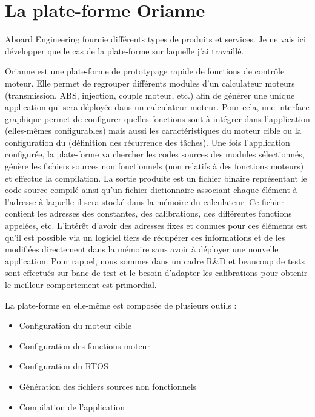 \section{La plate-forme Orianne}
\label{sec:orianne}

Aboard Engineering fournie différents types de produits et services. Je ne vais ici développer que le cas de la plate-forme  sur laquelle j'ai travaillé.

Orianne est une plate-forme de prototypage rapide de fonctions de contrôle moteur.
Elle permet de regrouper différents modules d'un calculateur moteurs (transmission, ABS, injection, couple moteur, etc.) afin de générer une unique application qui sera déployée dans un calculateur moteur.
Pour cela, une interface graphique permet de configurer quelles fonctions sont à intégrer dans l'application (elles-mêmes configurables) mais aussi les caractéristiques du moteur cible ou la configuration du  (définition des récurrence des tâches).
Une fois l'application configurée, la plate-forme va chercher les codes sources des modules sélectionnés, génère les fichiers sources non fonctionnels (non relatifs à des fonctions moteurs) et effectue la compilation.
La sortie produite est un fichier binaire représentant le code source compilé ainsi qu'un fichier \og dictionnaire \fg{} associant chaque élément à l'adresse à laquelle il sera stocké dans la mémoire du calculateur. Ce fichier contient les adresses des constantes, des calibrations, des différentes fonctions appelées, etc.
L'intérêt d'avoir des adresses fixes et connues pour ces éléments est qu'il est possible via un logiciel tiers de récupérer ces informations et de les modifiées directement dans la mémoire sans avoir à déployer une nouvelle application. Pour rappel, nous sommes dans un cadre R\&D et beaucoup de tests sont effectués sur banc de test et le besoin d'adapter les calibrations pour obtenir le meilleur comportement est primordial.

La plate-forme en elle-même est composée de plusieurs outils :
\begin{itemize}
	\item Configuration du moteur cible
	\item Configuration des fonctions moteur
	\item Configuration du RTOS
	\item Génération des fichiers sources non fonctionnels
	\item Compilation de l'application
\end{itemize}

